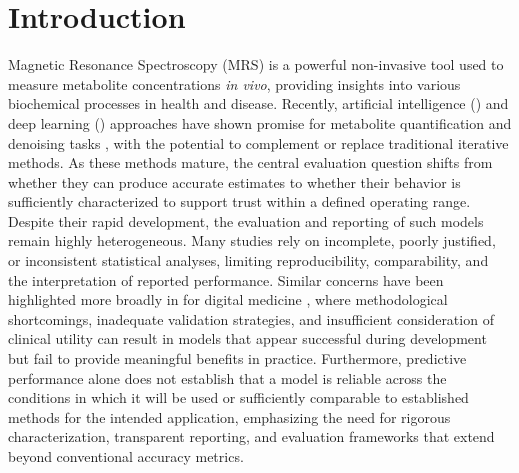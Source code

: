\section{Introduction}\label{sec:intro}
Magnetic Resonance Spectroscopy (MRS) is a powerful non-invasive tool used to measure metabolite concentrations \textit{in vivo}, providing insights into various biochemical processes in health and disease. Recently, artificial intelligence (\AI) and deep learning (\DL) approaches have shown promise for metabolite quantification \cite{Das2017, Das2018a, Olliverre2018, Iqbal2021, Schmid2023, Shamaei2023} and denoising tasks \cite{Lei2021, Chen2024, Lam2020, Li2022}, with the potential to complement or replace traditional iterative methods. As these methods mature, the central evaluation question shifts from whether they can produce accurate estimates to whether their behavior is sufficiently characterized to support trust within a defined operating range. Despite their rapid development, the evaluation and reporting of such \DL models remain highly heterogeneous. Many studies rely on incomplete, poorly justified, or inconsistent statistical analyses, limiting reproducibility, comparability, and the interpretation of reported performance. Similar concerns have been highlighted more broadly in \AI for digital medicine \cite{Muller2026}, where methodological shortcomings, inadequate validation strategies, and insufficient consideration of clinical utility can result in models that appear successful during development but fail to provide meaningful benefits in practice. Furthermore, predictive performance alone does not establish that a model is reliable across the conditions in which it will be used or sufficiently comparable to established methods for the intended application, emphasizing the need for rigorous characterization, transparent reporting, and evaluation frameworks that extend beyond conventional accuracy metrics.

